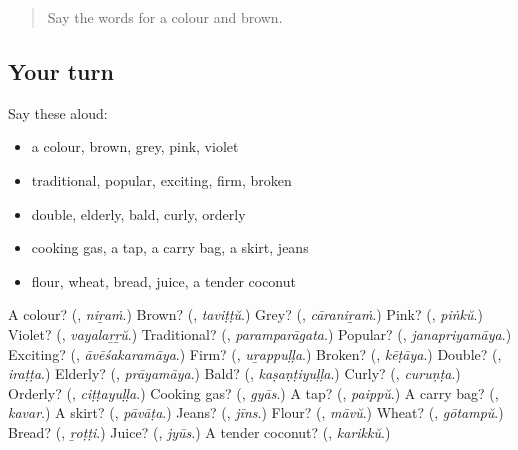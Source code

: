 \begin{quote}
Say the words for a colour and brown.
\end{quote}

\subsection*{Your turn}
Say these aloud:

\begin{itemize}
\raggedright
  \item a colour, brown, grey, pink, violet
  \item traditional, popular, exciting, firm, broken
  \item double, elderly, bald, curly, orderly
  \item cooking gas, a tap, a carry bag, a skirt, jeans
  \item flour, wheat, bread, juice, a tender coconut
\end{itemize}

\begin{tcolorbox}[breakable,colback=teal!4,colframe=teal!35!black,title={Before you move on}]
A colour? (\textbf{}, \emph{niṟaṁ}.) Brown? (\textbf{}, \emph{taviṭṭŭ}.) Grey? (\textbf{}, \emph{cāraniṟaṁ}.) Pink? (\textbf{}, \emph{piṅkŭ}.) Violet? (\textbf{}, \emph{vayalaṟṟŭ}.) Traditional? (\textbf{}, \emph{paramparāgata}.) Popular? (\textbf{}, \emph{janapriyamāya}.) Exciting? (\textbf{}, \emph{āvēśakaramāya}.) Firm? (\textbf{}, \emph{uṟappuḷḷa}.) Broken? (\textbf{}, \emph{kēṭāya}.) Double? (\textbf{}, \emph{iraṭṭa}.) Elderly? (\textbf{}, \emph{prāyamāya}.) Bald? (\textbf{}, \emph{kaṣaṇṭiyuḷḷa}.) Curly? (\textbf{}, \emph{curuṇṭa}.) Orderly? (\textbf{}, \emph{ciṭṭayuḷḷa}.) Cooking gas? (\textbf{}, \emph{gyās}.) A tap? (\textbf{}, \emph{paippŭ}.) A carry bag? (\textbf{}, \emph{kavar}.) A skirt? (\textbf{}, \emph{pāvāṭa}.) Jeans? (\textbf{}, \emph{jīns}.) Flour? (\textbf{}, \emph{māvŭ}.) Wheat? (\textbf{}, \emph{gōtampŭ}.) Bread? (\textbf{}, \emph{ṟoṭṭi}.) Juice? (\textbf{}, \emph{jyūs}.) A tender coconut? (\textbf{}, \emph{karikkŭ}.)
\end{tcolorbox}
